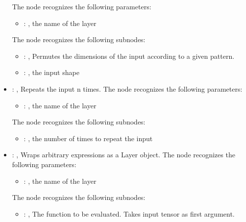 \begin{itemize}
      The  node recognizes the following parameters:
        \begin{itemize}
          \item {}: , 
            the name of the layer
      \end{itemize}

      The  node recognizes the following subnodes:
      \begin{itemize}
        \item {}: , 
          Permutes the dimensions of the input according to a given pattern.

        \item {}: , 
          the input shape
      \end{itemize}

    \item {}: , 
      Repeats the input n times.
      The  node recognizes the following parameters:
        \begin{itemize}
          \item {}: , 
            the name of the layer
      \end{itemize}

      The  node recognizes the following subnodes:
      \begin{itemize}
        \item {}: , 
          the number of times to repeat the input
      \end{itemize}

    \item {}: , 
      Wraps arbitrary expressions as a Layer object.
      The  node recognizes the following parameters:
        \begin{itemize}
          \item {}: , 
            the name of the layer
      \end{itemize}

      The  node recognizes the following subnodes:
      \begin{itemize}
        \item {}: , 
          The function to be evaluated. Takes input tensor as first argument.
      \end{itemize}


\end{itemize}
